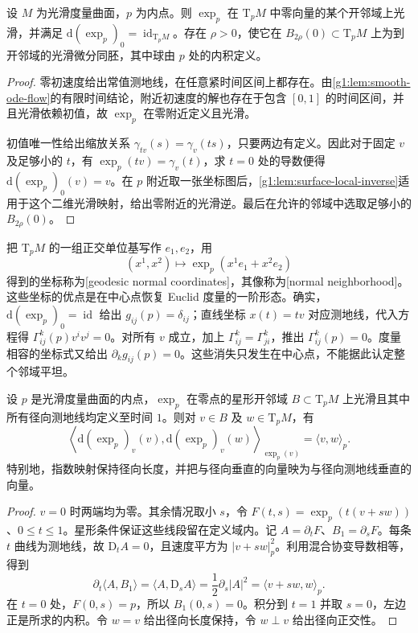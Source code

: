 \begin{proposition}
	\label{g1:prop:normal-neighborhood}
	设 \(M\) 为光滑度量曲面，\(p\) 为内点。则 \(\exp_p\) 在 \(\mathrm{T}_pM\) 中零向量的某个开邻域上光滑，并满足 \(\mathrm{d}(\exp_p)_0=\operatorname{id}_{\mathrm{T}_pM}\)。存在 \(\rho>0\)，使它在 \(B_{2\rho}(0)\subset \mathrm{T}_pM\) 上为到开邻域的光滑微分同胚，其中球由 \(p\) 处的内积定义。
\end{proposition}
\begin{proof}
	零初速度给出常值测地线，在任意紧时间区间上都存在。由\cref{g1:lem:smooth-ode-flow}的有限时间结论，附近初速度的解也存在于包含 \([0,1]\) 的时间区间，并且光滑依赖初值，故 \(\exp_p\) 在零附近定义且光滑。

	初值唯一性给出缩放关系 \(\gamma_{tv}(s)=\gamma_v(ts)\)，只要两边有定义。因此对于固定 \(v\) 及足够小的 \(t\)，有 \(\exp_p(tv)=\gamma_v(t)\)，求 \(t=0\) 处的导数便得 \(\mathrm{d}(\exp_p)_0(v)=v\)。在 \(p\) 附近取一张坐标图后，\cref{g1:lem:surface-local-inverse}适用于这个二维光滑映射，给出零附近的光滑逆。最后在允许的邻域中选取足够小的 \(B_{2\rho}(0)\)。
\end{proof}

把 \(\mathrm{T}_pM\) 的一组正交单位基写作 \(e_1,e_2\)，用
\[
	(x^1,x^2)\longmapsto\exp_p(x^1e_1+x^2e_2)
\]
得到的坐标称为[geodesic normal coordinates]，其像称为[normal neighborhood]。这些坐标的优点是在中心点恢复 Euclid 度量的一阶形态。确实，\(\mathrm{d}(\exp_p)_0=\operatorname{id}\) 给出 \(g_{ij}(p)=\delta_{ij}\)；直线坐标 \(x(t)=tv\) 对应测地线，代入方程得 \(\Gamma^k_{ij}(p)v^iv^j=0\)。对所有 \(v\) 成立，加上 \(\Gamma^k_{ij}=\Gamma^k_{ji}\)，推出 \(\Gamma^k_{ij}(p)=0\)。度量相容的坐标式又给出 \(\partial_k g_{ij}(p)=0\)。这些消失只发生在中心点，不能据此认定整个邻域平坦。

\begin{lemma}[Gauss 引理]
	\label{g1:lem:gauss-lemma}
	设 \(p\) 是光滑度量曲面的内点，\(\exp_p\) 在零点的星形开邻域 \(B\subset \mathrm{T}_pM\) 上光滑且其中所有径向测地线均定义至时间 \(1\)。则对 \(v\in B\) 及 \(w\in \mathrm{T}_pM\)，有
	\[
		\left\langle\mathrm{d}(\exp_p)_v(v),\mathrm{d}(\exp_p)_v(w)\right\rangle_{\exp_p(v)}
		=\langle v,w\rangle_p.
	\]
	特别地，指数映射保持径向长度，并把与径向垂直的向量映为与径向测地线垂直的向量。
\end{lemma}
\begin{proof}
	\(v=0\) 时两端均为零。其余情况取小 \(s\)，令 \(F(t,s)=\exp_p(t(v+sw))\)、\(0\le t\le1\)。星形条件保证这些线段留在定义域内。记 \(A=\partial_tF\)、\(B_1=\partial_sF\)。每条 \(t\) 曲线为测地线，故 \(\mathrm{D}_tA=0\)，且速度平方为 \(|v+sw|_p^2\)。利用混合协变导数相等，得到
	\[
		\partial_t\langle A,B_1\rangle
		=\langle A,\mathrm{D}_sA\rangle
		=\frac12\partial_s|A|^2
		=\langle v+sw,w\rangle_p.
	\]
	在 \(t=0\) 处，\(F(0,s)=p\)，所以 \(B_1(0,s)=0\)。积分到 \(t=1\) 并取 \(s=0\)，左边正是所求的内积。令 \(w=v\) 给出径向长度保持，令 \(w\perp v\) 给出径向正交性。
\end{proof}

